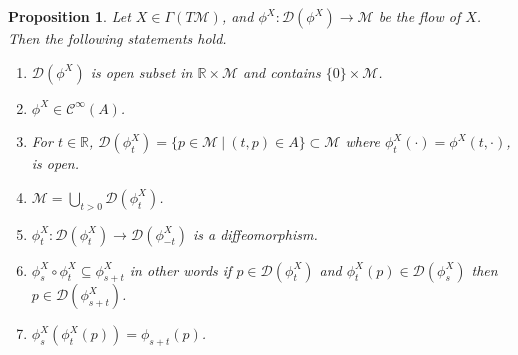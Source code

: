 \documentclass[8pt]{article}
\newtheorem{proposition}{Proposition}[section]
\newcommand{\R}[0]{\mathbb{R}}
\newcommand{\M}[0]{\mathcal{M}}
\newcommand{\sep}[0]{\:|\:}
\begin{document}
\begin{proposition}
  Let $X\in\Gamma(T\M)$, and $\phi^X:\mathcal{D}(\phi^X)\to \M$ be the flow of $X$. Then the following statements hold.
  \begin{enumerate}[1).]
    \item $\mathcal{D}(\phi^X)$ is open subset in $\R\times \M$ and contains $\{0\}\times\M$. 
    \item $\phi^X\in\mathcal{C}^\infty(A)$.
    \item For $t\in\R$, $\mathcal{D}(\phi^X_t) = \{p\in\M\sep (t,p)\in A\}\subset\M$  where $\phi_t^X(\cdot) = \phi^X(t,\cdot)$, is open. 
    \item $\M = \bigcup_{t>0}\mathcal{D}(\phi^X_t)$.
    \item $\phi_t^X:\mathcal{D}(\phi_t^X)\to\mathcal{D}(\phi^X_{-t})$ is a diffeomorphism.
    \item $\phi^X_s\circ\phi^X_t \subseteq \phi_{s+t}^X$ in other words if $p\in\mathcal{D}(\phi_t^X)$ and $\phi_t^X(p)\in\mathcal{D}(\phi_{s}^X)$ then $p\in\mathcal{D}(\phi^X_{s+t})$.
    \item $\phi^X_s(\phi_t^X(p)) = \phi_{s+t}(p)$.
  \end{enumerate}
\end{proposition}
\setcounter{claim}{0}
\end{document}
